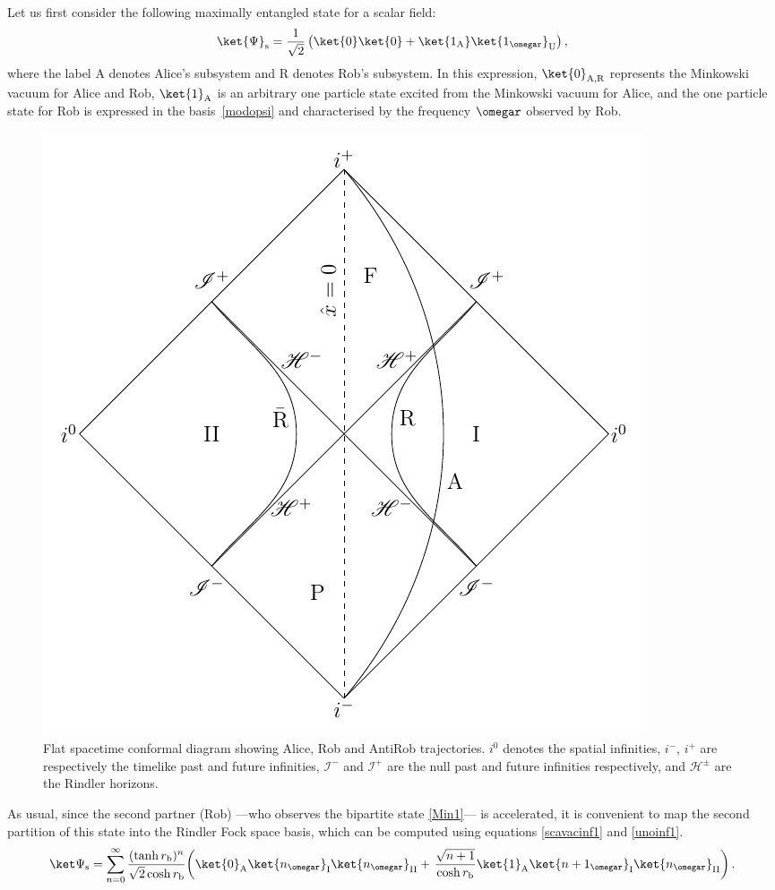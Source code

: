 Let us first consider the following maximally entangled state for a scalar
field:
\begin{equation}\label{Min1}
\ket{\Psi}_\text{s}=\frac{1}{\sqrt2}\left(\ket{0}\ket{0}
+\ket{1_\text{A}}\ket{1_{\omegar}}_\text{U}\right),
\end{equation}
where the label A denotes Alice's subsystem and R denotes Rob's
subsystem. In this expression, $\ket{0}_{\text{A,R}}$ represents the
Minkowski vacuum for Alice and Rob, $\ket{1}_\text{A}$ is an arbitrary
one particle state excited from the Minkowski vacuum for Alice, and the
one particle state for Rob is expressed in the basis~\eqref{modopsi} and
characterised by the frequency $\omegar$ observed by Rob.
\begin{figure}[h]
\begin{center}
\includegraphics[width=.85\textwidth]{fig-rindler}
\caption{Flat spacetime conformal diagram showing Alice, Rob and AntiRob
trajectories. $i^0$ denotes the spatial infinities, $i^-$, $i^+$ are
respectively the timelike  past and future infinities,
$\mathscr{I}^-$ and $\mathscr{I}^+$ are the null past and future infinities
respectively, and $\mathscr{H}^\pm$ are the Rindler horizons.}
\end{center}
\label{Rindler}
\end{figure}
As usual, since the second partner (Rob) ---who  observes the bipartite state
\eqref{Min1}--- is accelerated, it is convenient to map the second partition
of this state  into the Rindler Fock space basis, which can be computed
using equations
\eqref{scavacinf1} and \eqref{unoinf1}.
\begin{equation}\label{Minscalar}
\ket\Psi_\text{s}=\sum_{n=0}^\infty \frac{(\tanh r_{\text{b}})^n}{\sqrt{2}
\cosh r_{\text{b}}} \bigg(\ket{0}_\text{A}
\ket{n_{\omegar}}_\text{I}\ket{n_{\omegar}}_{{\text{II}}}+\left.\frac{\sqrt{n+1}}{\cosh r_{\text{b}}}\ket{1}_\text{A}
 \ket{n+1_{\omegar}}_\text{I}\ket{n_{\omegar}}_{\text{II}}\right).
 \end{equation}
 
